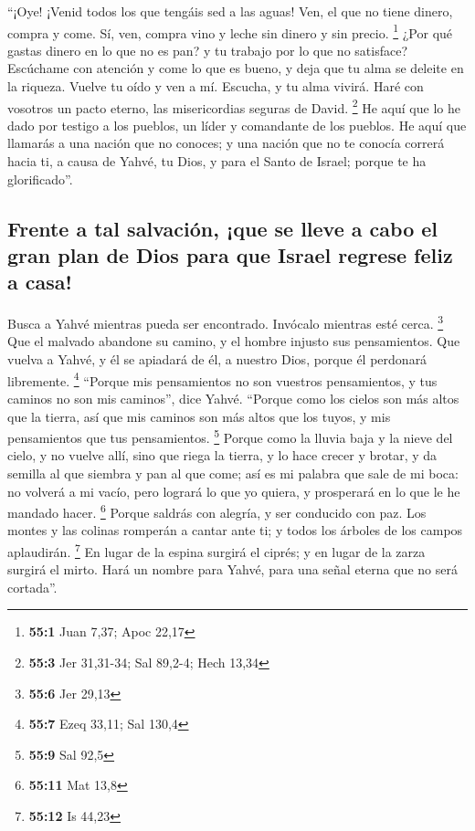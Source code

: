  ``¡Oye! ¡Venid todos los que tengáis sed a las aguas!
Ven, el que no tiene dinero, compra y come. Sí, ven, compra vino y leche
sin dinero y sin precio. \footnote{\textbf{55:1} Juan 7,37; Apoc 22,17}
 ¿Por qué gastas dinero en lo que no es pan? y tu trabajo
por lo que no satisface? Escúchame con atención y come lo que es bueno,
y deja que tu alma se deleite en la riqueza.  Vuelve tu
oído y ven a mí. Escucha, y tu alma vivirá. Haré con vosotros un pacto
eterno, las misericordias seguras de David. \footnote{\textbf{55:3} Jer
  31,31-34; Sal 89,2-4; Hech 13,34}  He aquí que lo he
dado por testigo a los pueblos, un líder y comandante de los pueblos.
 He aquí que llamarás a una nación que no conoces; y una
nación que no te conocía correrá hacia ti, a causa de Yahvé, tu Dios, y
para el Santo de Israel; porque te ha glorificado''.

\hypertarget{frente-a-tal-salvaciuxf3n-que-se-lleve-a-cabo-el-gran-plan-de-dios-para-que-israel-regrese-feliz-a-casa}{%
\subsection{Frente a tal salvación, ¡que se lleve a cabo el gran plan de
Dios para que Israel regrese feliz a
casa!}\label{frente-a-tal-salvaciuxf3n-que-se-lleve-a-cabo-el-gran-plan-de-dios-para-que-israel-regrese-feliz-a-casa}}

 Busca a Yahvé mientras pueda ser encontrado. Invócalo
mientras esté cerca. \footnote{\textbf{55:6} Jer 29,13} 
Que el malvado abandone su camino, y el hombre injusto sus pensamientos.
Que vuelva a Yahvé, y él se apiadará de él, a nuestro Dios, porque él
perdonará libremente. \footnote{\textbf{55:7} Ezeq 33,11; Sal 130,4}
 ``Porque mis pensamientos no son vuestros pensamientos, y
tus caminos no son mis caminos'', dice Yahvé.  ``Porque
como los cielos son más altos que la tierra, así que mis caminos son más
altos que los tuyos, y mis pensamientos que tus pensamientos.
\footnote{\textbf{55:9} Sal 92,5}  Porque como la lluvia
baja y la nieve del cielo, y no vuelve allí, sino que riega la tierra, y
lo hace crecer y brotar, y da semilla al que siembra y pan al que come;
 así es mi palabra que sale de mi boca: no volverá a mi
vacío, pero logrará lo que yo quiera, y prosperará en lo que le he
mandado hacer. \footnote{\textbf{55:11} Mat 13,8}  Porque
saldrás con alegría, y ser conducido con paz. Los montes y las colinas
romperán a cantar ante ti; y todos los árboles de los campos aplaudirán.
\footnote{\textbf{55:12} Is 44,23}  En lugar de la espina
surgirá el ciprés; y en lugar de la zarza surgirá el mirto. Hará un
nombre para Yahvé, para una señal eterna que no será cortada''.

